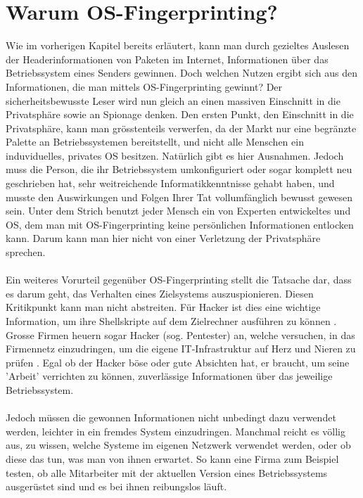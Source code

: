 \documentclass{article} %
\begin{document}
\section{Warum OS-Fingerprinting?}
Wie im vorherigen Kapitel bereits erläutert, kann man durch gezieltes Auslesen der Headerinformationen von Paketen im Internet, Informationen über das Betriebssystem eines Senders gewinnen. Doch welchen Nutzen ergibt sich aus den Informationen, die man mittels OS-Fingerprinting gewinnt?
Der sicherheitsbewusste Leser wird nun gleich an einen massiven Einschnitt in die Privatsphäre sowie an Spionage denken. Den ersten Punkt, den Einschnitt in die Privatsphäre, kann man grösstenteils verwerfen, da der Markt nur eine begränzte Palette an Betriebssystemen bereitstellt, und nicht alle Menschen ein induviduelles, privates OS besitzen. Natürlich gibt es hier Ausnahmen. Jedoch muss die Person, die ihr Betriebssystem umkonfiguriert oder sogar komplett neu geschrieben hat, sehr weitreichende Informatikkenntnisse gehabt haben, und musste den Auswirkungen und Folgen Ihrer Tat vollumfänglich bewusst gewesen sein. Unter dem Strich benutzt jeder Mensch ein von Experten entwickeltes und OS, dem man mit OS-Fingerprinting keine persönlichen Informationen entlocken kann. Darum kann man hier nicht von einer Verletzung der Privatsphäre sprechen.\\
\\
Ein weiteres Vorurteil gegenüber OS-Fingerprinting stellt die Tatsache dar, dass es darum geht, das Verhalten eines Zielsystems auszuspionieren. Diesen Kritikpunkt kann man nicht abstreiten. Für Hacker ist dies eine wichtige Information, um ihre Shellskripte auf dem Zielrechner ausführen zu können \cite{nmap_osdetect}. Grosse Firmen heuern sogar Hacker (sog. Pentester) an, welche versuchen, in das Firmennetz einzudringen, um die eigene IT-Infrastruktur auf Herz und Nieren zu prüfen \cite{pentester}. Egal ob der Hacker böse oder gute Absichten hat, er braucht, um seine 'Arbeit' verrichten zu können, zuverlässige Informationen über das jeweilige Betriebssystem.\\
\\
Jedoch müssen die gewonnen Informationen nicht unbedingt dazu verwendet werden, leichter in ein fremdes System einzudringen. Manchmal reicht es völlig aus, zu wissen, welche Systeme im eigenen Netzwerk verwendet werden, oder ob diese das tun, was man von ihnen erwartet. So kann eine Firma zum Beispiel testen, ob alle Mitarbeiter mit der aktuellen Version eines Betriebssystems ausgerüstet sind und es bei ihnen reibungslos läuft.
\end{document}

